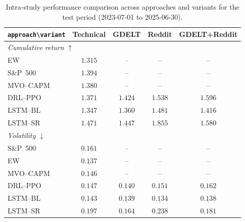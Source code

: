 \begin{table}[ht]
\centering
\caption{Intra-study performance comparison across approaches and variants for the test period (2023-07-01 to 2025-06-30).}
\label{tab:combined_metrics}
\renewcommand{\arraystretch}{1.2}
\begin{tabular}{|l | c c c c|}
\hline
\texttt{approach\textbackslash variant} & \textbf{Technical} & \textbf{GDELT} & \textbf{Reddit} & \textbf{GDELT+Reddit} \\
\hline\hline
\multicolumn{5}{|l|}{\textit{Cumulative return} $\uparrow$} \\
\hline
EW              & $1.315$                      & --                          & --                               & --      \\
S\&P~500      & $1.394$                      & --                          & --                               & --      \\
MVO--CAPM       & $1.380$                      & --                          & --                               & --      \\
DRL--PPO        & $1.371$                      & $1.424$                     & $1.538$                          & $\underline{\mathbf{1.596}}$ \\
LSTM--BL        & $1.347$                      & $1.360$                     & $\mathbf{1.481}$                 & $1.416$ \\
LSTM--SR        & $\underline{1.471}$          & $\underline{1.447}$         & $\underline{\mathbf{1.855}}$     & $1.580$ \\
\hline\hline
\multicolumn{5}{|l|}{\textit{Volatility} $\downarrow$} \\
\hline
S\&P~500      & $0.161$                      & --                          & --                               & --      \\
EW              & $\underline{0.137}$          & --                          & --                               & --      \\
MVO--CAPM       & $0.146$                      & --                          & --                               & --      \\
DRL--PPO        & $0.147$                      & $\mathbf{0.140}$            & $0.151$                          & $0.162$ \\
LSTM--BL        & $0.143$                      & $\underline{0.139}$         & $\underline{\mathbf{0.134}}$     & $\underline{0.138}$ \\
LSTM--SR        & $0.197$                      & $\mathbf{0.164}$            & $0.238$                          & $0.181$ \\

\end{tabular}
\end{table}
